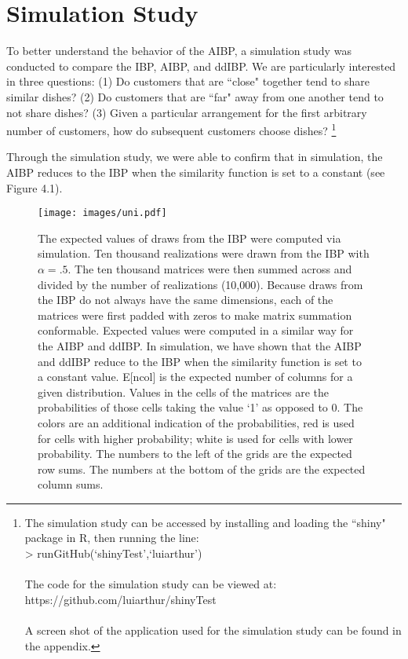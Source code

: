 \section{Simulation Study}
To better understand the behavior of the AIBP, a simulation study was conducted
to compare the IBP, AIBP, and ddIBP. We are particularly interested in three
questions: 
(1) Do customers that are ``close" together tend to share similar dishes?
(2) Do customers that are ``far" away from one another tend to not share dishes?
(3) Given a particular arrangement for the first arbitrary number of customers,
how do subsequent customers choose dishes? 
\footnote{The simulation study can be accessed by installing and loading the
``shiny" package in R, then running the line: \\
> runGitHub(`shinyTest',`luiarthur')\\\\
The code for the simulation study can be viewed at: \\
https://github.com/luiarthur/shinyTest\\\\
A screen shot of the application used for the 
simulation study can be found in the appendix.}

\noindent
Through the simulation study, we were able to confirm that in simulation, the
AIBP reduces to the IBP when the similarity function is set to a constant (see
Figure 4.1).\\

\begin{figure}\begin{center}
  \texttt{[image: images/uni.pdf]}
  \caption{The expected values of draws from the IBP were computed via simulation.
           Ten thousand realizations were drawn from the IBP with $\alpha=.5$.
           The ten thousand matrices were then summed across and divided by the
           number of realizations (10,000). Because draws from the IBP do not
           always have the same dimensions, each of the matrices were first padded
           with zeros to make matrix summation conformable. Expected values were
           computed in a similar way for the AIBP and ddIBP. In simulation, we
           have shown that the AIBP and ddIBP reduce to the IBP when the similarity
           function is set to a constant value. E[ncol] is the expected number of
           columns for a given distribution. Values in the cells of the matrices
           are the probabilities of those cells taking the value `1' as opposed
           to 0. The colors are an additional indication of the probabilities,
           red is used for cells with higher probability; white is used for cells
           with lower probability. The numbers to the left of the grids are the 
           expected row sums. The numbers at the bottom of the grids are the
           expected column sums.}
\end{center}\end{figure}

